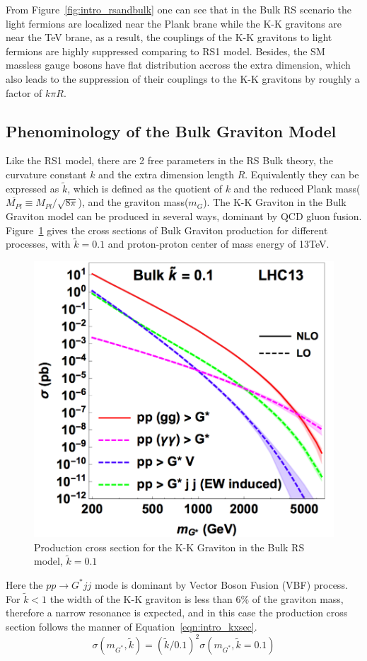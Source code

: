 From Figure~\ref{fig:intro_rsandbulk} one can see that in the Bulk RS scenario the light fermions are localized near the Plank brane while the K-K gravitons are near the TeV brane, as a result, the couplings of the K-K gravitons to light fermions are highly suppressed comparing to RS1 model. Besides, the SM massless gauge bosons have flat distribution accross the extra dimension, which also leads to the suppression of their couplings to the K-K gravitons by roughly a factor of $k\pi R$.

\subsection{Phenominology of the Bulk Graviton Model}
Like the RS1 model, there are 2 free parameters in the RS Bulk theory, the curvature constant $k$ and the extra dimension length $R$. Equivalently they can be expressed as $\tilde{k}$, which is defined as the quotient of $k$ and the reduced Plank mass($\overline{M_{Pl}}\equiv M_{Pl}/\sqrt{8\pi}$), and the graviton mass($m_{G}$). The K-K Graviton in the Bulk Graviton model can be produced in several ways, dominant by QCD gluon fusion. Figure~\ref{fig:intro_Gxsec} gives the cross sections of Bulk Graviton production for different processes, with $\tilde{k}=0.1$ and proton-proton center of mass energy of 13TeV.
\begin{figure}[htbp]
\begin{center}
\includegraphics[width=0.5\linewidth]{figures/intro_Gxsec.png}
\caption{Production cross section for the K-K Graviton in the Bulk RS model, $\tilde{k}=0.1$}
\label{fig:intro_Gxsec}
\end{center}
\end{figure}
Here the $pp\rightarrow G^{*}jj$ mode is dominant by Vector Boson Fusion (VBF) process. For $\tilde{k}<1$ the width of the K-K graviton is less than 6\% of the graviton mass, therefore a narrow resonance is expected, and in this case the production cross section follows the manner of Equation~\ref{eqn:intro_kxsec}.
\begin{equation}
\sigma (m_{G^{*}},\tilde{k}) = (\tilde{k}/0.1)^2 \sigma (m_{G^{*}},\tilde{k}=0.1)
\label{eqn:intro_kxsec}
\end{equation}


